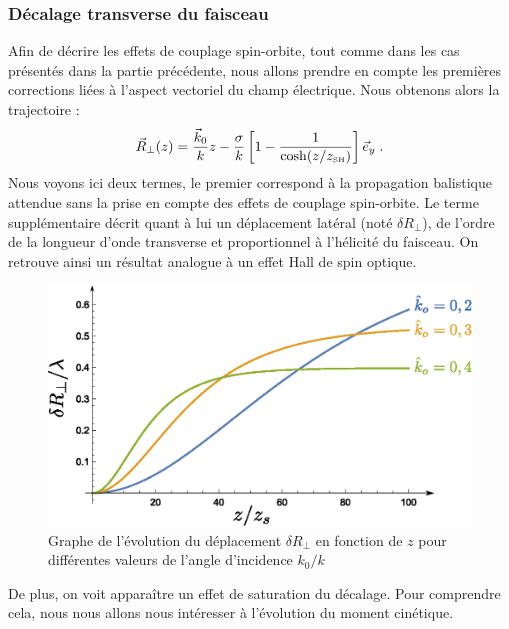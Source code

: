 \documentclass[a4paper,11pt]{article} %
\begin{document}
	
	\subsubsection{Décalage transverse du faisceau}
	
	Afin de décrire les effets de couplage spin-orbite, tout comme dans les cas présentés dans la partie précédente, nous allons prendre en compte les premières corrections liées à l'aspect vectoriel du champ électrique.	Nous obtenons alors la trajectoire :
	\begin{equation*}
		\vec{R}_\perp (z) = \frac{\vec{k}_0}{k} z - \frac{\sigma}{k} \left[ 1 - \frac{1}{\cosh (z/z_\text{\tiny SH})} \right] \vec{e}_y \; .
	\end{equation*}
	Nous voyons ici deux termes, le premier correspond à la propagation balistique attendue sans la prise en compte des effets de couplage spin-orbite. Le terme supplémentaire décrit quant à lui un déplacement latéral (noté $ \delta R_\perp $), de l'ordre de la longueur d'onde transverse et proportionnel à l'hélicité du faisceau. On retrouve ainsi un résultat analogue à un effet Hall de spin optique.
	
	\begin{figure}[h]
		\centering
		\begin{minipage}[c]{0.85\linewidth}
			\centering
			\includegraphics[width=0.8\linewidth]{./Illustrations/Plot_delta-R}
			\caption{Graphe de l'évolution du déplacement $ \delta R_\perp $ en fonction de $ z $ pour différentes valeurs de l'angle d'incidence $ k_0/k $}
			\label{fig:Plot_delta-R}
		\end{minipage}
	\end{figure}
	
	De plus, on voit apparaître un effet de saturation du décalage. Pour comprendre cela, nous nous allons nous intéresser à l'évolution du moment cinétique.
	
	
\end{document}
